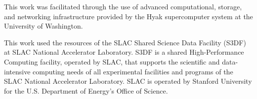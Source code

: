 \documentclass[]{aastex631}
\begin{document}
{}


\begin{acknowledgments}
This work was facilitated through the use of advanced computational, storage, and networking infrastructure provided by the Hyak supercomputer system at the University of Washington.

This work used the resources of the SLAC Shared Science Data Facility (S3DF) at SLAC National Accelerator Laboratory. S3DF is a shared High-Performance Computing facility, operated by SLAC, that supports the scientific and data-intensive computing needs of all experimental facilities and programs of the SLAC National Accelerator Laboratory. SLAC is operated by Stanford University for the U.S. Department of Energy’s Office of Science.
\end{acknowledgments}
\end{document}
